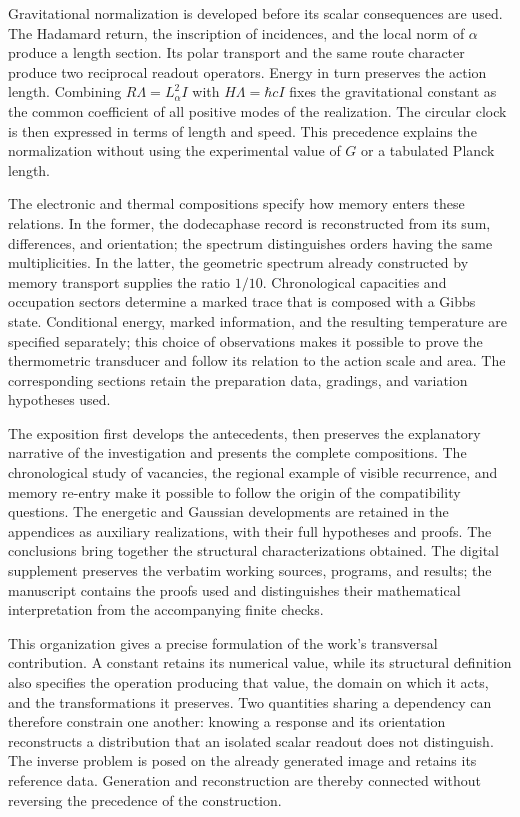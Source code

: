 Gravitational normalization is developed before its scalar consequences
are used. The Hadamard return, the inscription of incidences, and the
local norm of $\alpha$ produce a length section. Its polar transport
and the same route character produce two reciprocal readout operators.
Energy in turn preserves the action length. Combining
$R\Lambda=L_\alpha^2I$ with $H\Lambda=\hbar cI$ fixes the gravitational
constant as the common coefficient of all positive modes of the
realization. The circular clock is then expressed in terms of length
and speed. This precedence explains the normalization without using
the experimental value of $G$ or a tabulated Planck length.

The electronic and thermal compositions specify how memory enters these
relations. In the former, the dodecaphase record is reconstructed from
its sum, differences, and orientation; the spectrum distinguishes
orders having the same multiplicities. In the latter, the geometric
spectrum already constructed by memory transport supplies the ratio
$1/10$. Chronological capacities and occupation sectors determine a
marked trace that is composed with a Gibbs state. Conditional energy,
marked information, and the resulting temperature are specified
separately; this choice of observations makes it possible to prove the
thermometric transducer and follow its relation to the action scale and
area. The corresponding sections retain the preparation data, gradings,
and variation hypotheses used.

The exposition first develops the antecedents, then preserves the
explanatory narrative of the investigation and presents the complete
compositions. The chronological study of vacancies, the regional example
of visible recurrence, and memory re-entry make it possible to follow the
origin of the compatibility questions. The energetic and Gaussian
developments are retained in the appendices as auxiliary realizations,
with their full hypotheses and proofs. The conclusions bring together
the structural characterizations obtained. The digital supplement
preserves the verbatim working sources, programs, and results; the
manuscript contains the proofs used and distinguishes their mathematical
interpretation from the accompanying finite checks.

This organization gives a precise formulation of the work's transversal
contribution. A constant retains its numerical value, while its structural
definition also specifies the operation producing that value, the domain
on which it acts, and the transformations it preserves. Two quantities
sharing a dependency can therefore constrain one another: knowing a
response and its orientation reconstructs a distribution that an isolated
scalar readout does not distinguish. The inverse problem is posed on the
already generated image and retains its reference data. Generation and
reconstruction are thereby connected without reversing the precedence of
the construction.

